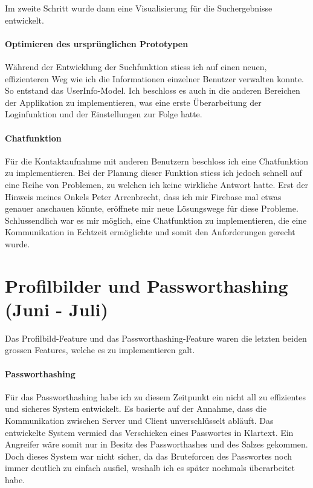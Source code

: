 \documentclass[../main.tex]{subfiles}
\begin{document}
	Im zweite Schritt wurde dann eine Visualisierung für die Suchergebnisse entwickelt.
	
	\paragraph{Optimieren des ursprünglichen Prototypen}
	Während der Entwicklung der Suchfunktion stiess ich auf einen neuen, effizienteren Weg wie ich die Informationen einzelner Benutzer verwalten konnte. So entstand das UserInfo-Model. Ich beschloss es auch in die anderen Bereichen der Applikation zu implementieren, was eine erste Überarbeitung der Loginfunktion und der Einstellungen zur Folge hatte.
	
	\paragraph{Chatfunktion}
	Für die Kontaktaufnahme mit anderen Benutzern beschloss ich eine Chatfunktion zu implementieren. Bei der Planung dieser Funktion stiess ich jedoch schnell auf eine Reihe von Problemen, zu welchen ich keine wirkliche Antwort hatte. Erst der Hinweis meines Onkels Peter Arrenbrecht, dass ich mir Firebase mal etwas genauer anschauen könnte, eröffnete mir neue Lösungswege für diese Probleme. Schlussendlich war es mir möglich, eine Chatfunktion zu implementieren, die eine Kommunikation in Echtzeit ermöglichte und somit den Anforderungen gerecht wurde.
	
	\section{Profilbilder und Passworthashing (Juni - Juli)}
	Das Profilbild-Feature und das Passworthashing-Feature waren die letzten beiden grossen Features, welche es zu implementieren galt.
	\paragraph{Passworthashing}
	Für das Passworthashing habe ich zu diesem Zeitpunkt ein nicht all zu effizientes und sicheres System entwickelt. Es basierte auf der Annahme, dass die Kommunikation zwischen Server und Client unverschlüsselt abläuft. Das entwickelte System vermied das Verschicken eines Passwortes in Klartext. Ein Angreifer wäre somit nur in Besitz des Passworthashes und des Salzes gekommen. Doch dieses System war nicht sicher, da das Bruteforcen des Passwortes noch immer deutlich zu einfach ausfiel, weshalb ich es später nochmals überarbeitet habe.
	
\end{document}
